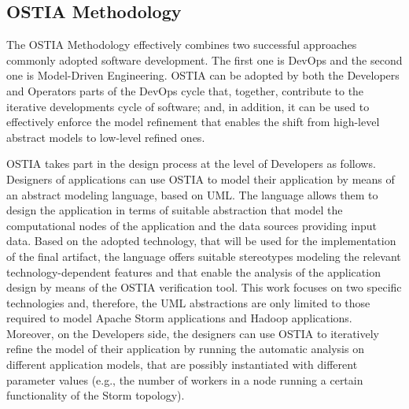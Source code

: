 {\color{blue}
\subsection{OSTIA Methodology}
\label{sec:methodology}
The OSTIA Methodology effectively combines two successful approaches commonly adopted software development. 
The first one is DevOps and the second one is Model-Driven Engineering.
OSTIA can be adopted by both the Developers and Operators parts of the DevOps cycle that, together, contribute to the iterative developments cycle of software; and, in addition, it can be used to effectively enforce the model refinement that enables the shift from high-level abstract models to low-level refined ones.

OSTIA takes part in the design process at the level of Developers as follows.
Designers of applications can use OSTIA to model their application by means of an abstract modeling language, based on UML. 
The language allows them to design the application in terms of suitable abstraction that model the computational nodes of the application and the data sources providing input data.
Based on the adopted technology, that will be used for the implementation of the final artifact, the language offers suitable stereotypes modeling the relevant technology-dependent features and that enable the analysis of the application design by means of the OSTIA verification tool.
This work focuses on two specific technologies and, therefore, the UML abstractions are only limited to those required to model Apache Storm applications and Hadoop applications.
Moreover, on the Developers side, the designers can use OSTIA to iteratively refine the model of their application by running the automatic analysis on different application models, that are possibly instantiated with different parameter values (e.g., the number of workers in a node running a certain functionality of the Storm topology).

}
